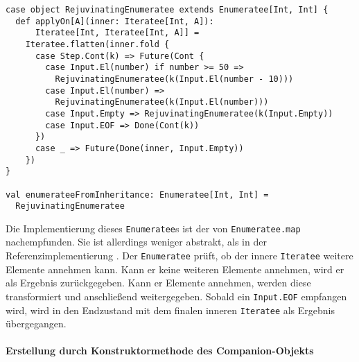 \begin{lstlisting}[caption=Erstellung eines Enumeratees durch Vererbung, label=lst:enumerateeerstellung_durch_vererbung]
case object RejuvinatingEnumeratee extends Enumeratee[Int, Int] {
  def applyOn[A](inner: Iteratee[Int, A]):
      Iteratee[Int, Iteratee[Int, A]] =
    Iteratee.flatten(inner.fold {
      case Step.Cont(k) => Future(Cont {
        case Input.El(number) if number >= 50 =>
          RejuvinatingEnumeratee(k(Input.El(number - 10)))
        case Input.El(number) =>
          RejuvinatingEnumeratee(k(Input.El(number)))
        case Input.Empty => RejuvinatingEnumeratee(k(Input.Empty))
        case Input.EOF => Done(Cont(k))
      })
      case _ => Future(Done(inner, Input.Empty))
    })
}

val enumerateeFromInheritance: Enumeratee[Int, Int] =
  RejuvinatingEnumeratee
\end{lstlisting}

Die Implementierung dieses \lstinline|Enumeratee|s ist der von \lstinline|Enumeratee.map| nachempfunden.
Sie ist allerdings weniger abstrakt, als in der Referenzimplementierung \cite[vgl.][Z.~372, Z.~196 und Z.~85]{play_enumeratee_source_code}.
Der \lstinline|Enumeratee| prüft, ob der innere \lstinline|Iteratee| weitere Elemente annehmen kann.
Kann er keine weiteren Elemente annehmen, wird er als Ergebnis zurückgegeben.
Kann er Elemente annehmen, werden diese transformiert und anschließend weitergegeben.
Sobald ein \lstinline|Input.EOF| empfangen wird, wird in den Endzustand mit dem finalen inneren \lstinline|Iteratee| als Ergebnis übergegangen.


\paragraph{Erstellung durch Konstruktormethode des Companion-Objekts} %
\label{par:enumerateeerstellung_durch_konstruktormethode_des_companion_objekts}\mbox{} %


